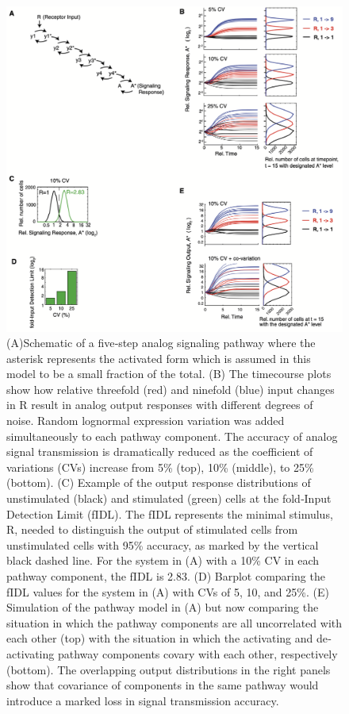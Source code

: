 \begin{figure}[hbt!]
\centering
\includegraphics[width=14cm, keepaspectratio]{figs/paper1/fig1.png}
\caption[Computational simulations using reported levels of expression variation show a dramatic loss of analog single‐cell transmission accuracy]{(A)Schematic of a five‐step analog signaling pathway where the asterisk represents the activated form which is assumed in this model to be a small fraction of the total. (B) The timecourse plots show how relative threefold (red) and ninefold (blue) input changes in R result in analog output responses with different degrees of noise. Random lognormal expression variation was added simultaneously to each pathway component. The accuracy of analog signal transmission is dramatically reduced as the coefficient of variations (CVs) increase from 5\% (top), 10\% (middle), to 25\% (bottom). (C) Example of the output response distributions of unstimulated (black) and stimulated (green) cells at the fold‐Input Detection Limit (fIDL). The fIDL represents the minimal stimulus, R, needed to distinguish the output of stimulated cells from unstimulated cells with 95\% accuracy, as marked by the vertical black dashed line. For the system in (A) with a 10\% CV in each pathway component, the fIDL is 2.83. (D) Barplot comparing the fIDL values for the system in (A) with CVs of 5, 10, and 25\%. (E) Simulation of the pathway model in (A) but now comparing the situation in which the pathway components are all uncorrelated with each other (top) with the situation in which the activating and de‐activating pathway components covary with each other, respectively (bottom). The overlapping output distributions in the right panels show that covariance of components in the same pathway would introduce a marked loss in signal transmission accuracy.}
\label{fig:paper1_fig1}
\end{figure}

